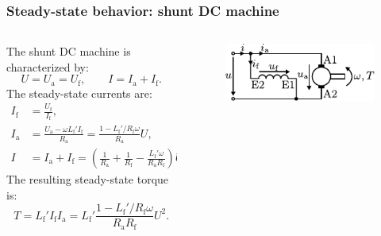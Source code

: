 \begin{frame}
	\frametitle{Steady-state behavior: shunt DC machine}
	\begin{columns}
		\begin{column}{0.55\textwidth}
		The shunt DC machine is characterized by:
	   \begin{equation}
		U = U_\mathrm{a}= U_\mathrm{f}, \qquad I = I_\mathrm{a} + I_\mathrm{f}.
	   \end{equation}
	   The steady-state currents are:
	   \begin{equation}
		\begin{split}
			I_\mathrm{f} &= \frac{U_\mathrm{f}}{I_\mathrm{f}},\\
			I_\mathrm{a} &= \frac{U_\mathrm{a} - \omega L_\mathrm{f}'I_\mathrm{f}}{R_\mathrm{a}} = \frac{1- L_\mathrm{f}'/R_\mathrm{f}\omega }{R_\mathrm{a}} U,\\
			I &= I_\mathrm{a} + I_\mathrm{f} = \left(\frac{1}{R_\mathrm{a}} + \frac{1}{R_\mathrm{f}} - \frac{L_\mathrm{f}'\omega}{R_\mathrm{a}R_\mathrm{f}}\right)U.
		\end{split}
		\end{equation}
		The resulting steady-state torque is:
		\begin{equation}
			T = L_\mathrm{f}' I_\mathrm{f} I_\mathrm{a} = L_\mathrm{f}'\frac{1- L_\mathrm{f}'/R_\mathrm{f}\omega }{R_\mathrm{a}R_\mathrm{f}}U^2.
		\end{equation}
\end{column}
\hfill
\begin{column}{0.45\textwidth}
	\begin{figure}
		\centering
		\includegraphics[scale=1.25]{fig/lec03/Shunt_DC_machine.pdf}
	\end{figure}
\end{column}
\end{columns}
\end{frame}

